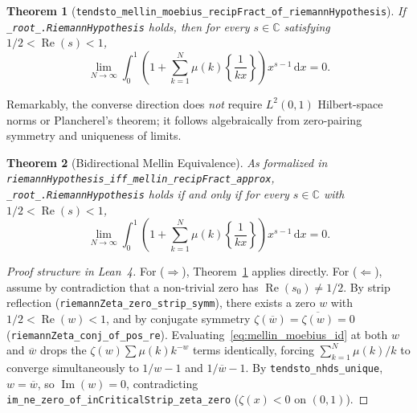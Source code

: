 \documentclass[11pt,a4paper]{article}
\newtheorem{theorem}{Theorem}[section]
\theoremstyle{definition}
\newcommand{\dee}{\mathrm{d}}
\newcommand{\Cfield}{\mathbb{C}}
\begin{document}
\begin{theorem}[\texttt{tendsto\_\allowbreak mellin\_\allowbreak moebius\_\allowbreak recipFract\_\allowbreak of\_\allowbreak riemannHypothesis}]\label{thm:mellin_converse}
If \texttt{\_root\_.\allowbreak RiemannHypothesis} holds, then for every $s \in \Cfield$ satisfying $1/2 < \operatorname{Re}(s) < 1$,
\begin{equation}
\lim_{N \to \infty} \int_0^1 \left(1 + \sum_{k=1}^N \mu(k) \left\{ \frac{1}{kx} \right\}\right) x^{s-1}\,\dee x = 0.
\end{equation}
\end{theorem}

Remarkably, the converse direction does \emph{not} require $L^2(0,1)$ Hilbert-space norms or Plancherel's theorem; it follows algebraically from zero-pairing symmetry and uniqueness of limits.

\begin{theorem}[Bidirectional Mellin Equivalence]\label{thm:mellin_iff}
As formalized in \texttt{riemannHypothesis\_\allowbreak iff\_\allowbreak mellin\_\allowbreak recipFract\_\allowbreak approx}, \texttt{\_root\_.\allowbreak RiemannHypothesis} holds if and only if for every $s \in \Cfield$ with $1/2 < \operatorname{Re}(s) < 1$,
\begin{equation}
\lim_{N \to \infty} \int_0^1 \left(1 + \sum_{k=1}^N \mu(k) \left\{ \frac{1}{kx} \right\}\right) x^{s-1}\,\dee x = 0.
\end{equation}
\end{theorem}

\begin{proof}[Proof structure in Lean~4]
For ($\Rightarrow$), Theorem~\ref{thm:mellin_converse} applies directly. For ($\Leftarrow$), assume by contradiction that a non-trivial zero has $\operatorname{Re}(s_0) \neq 1/2$. By strip reflection (\texttt{riemannZeta\_\allowbreak zero\_\allowbreak strip\_\allowbreak symm}), there exists a zero $w$ with $1/2 < \operatorname{Re}(w) < 1$, and by conjugate symmetry $\zeta(\overline{w}) = \overline{\zeta(w)} = 0$ (\texttt{riemannZeta\_\allowbreak conj\_\allowbreak of\_\allowbreak pos\_\allowbreak re}). Evaluating~\eqref{eq:mellin_moebius_id} at both $w$ and $\overline{w}$ drops the $\zeta(w)\sum \mu(k) k^{-w}$ terms identically, forcing $\sum_{k=1}^N \mu(k)/k$ to converge simultaneously to $1/w - 1$ and $1/\overline{w} - 1$. By \texttt{tendsto\_\allowbreak nhds\_\allowbreak unique}, $w = \overline{w}$, so $\operatorname{Im}(w) = 0$, contradicting \texttt{im\_\allowbreak ne\_\allowbreak zero\_\allowbreak of\_\allowbreak inCriticalStrip\_\allowbreak zeta\_\allowbreak zero} ($\zeta(x) < 0$ on $(0,1)$).
\end{proof}
\end{document}
